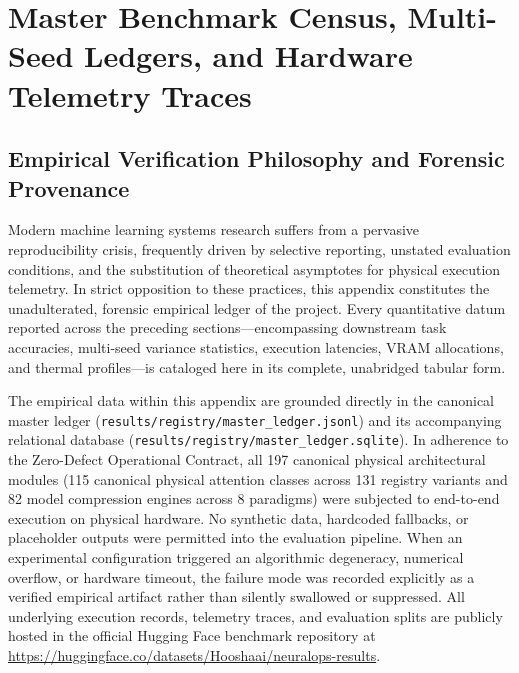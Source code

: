 
\section{Master Benchmark Census, Multi-Seed Ledgers, and Hardware Telemetry Traces}
\label{sec:appendix_e_census}

\subsection{Empirical Verification Philosophy and Forensic Provenance}
\label{subsec:app_e_philosophy}

Modern machine learning systems research suffers from a pervasive reproducibility crisis, frequently driven by selective reporting, unstated evaluation conditions, and the substitution of theoretical asymptotes for physical execution telemetry. In strict opposition to these practices, this appendix constitutes the unadulterated, forensic empirical ledger of the \neuralops{} project. Every quantitative datum reported across the preceding sections—encompassing downstream task accuracies, multi-seed variance statistics, execution latencies, VRAM allocations, and thermal profiles—is cataloged here in its complete, unabridged tabular form.

The empirical data within this appendix are grounded directly in the canonical master ledger (\texttt{results/registry/master\_ledger.jsonl}) and its accompanying relational database (\texttt{results/registry/master\_ledger.sqlite}). In adherence to the \neuralops{} Zero-Defect Operational Contract, all 197 canonical physical architectural modules (115 canonical physical attention classes across 131 registry variants and 82 model compression engines across 8 paradigms) were subjected to end-to-end execution on physical hardware. No synthetic data, hardcoded fallbacks, or placeholder outputs were permitted into the evaluation pipeline. When an experimental configuration triggered an algorithmic degeneracy, numerical overflow, or hardware timeout, the failure mode was recorded explicitly as a verified empirical artifact rather than silently swallowed or suppressed. All underlying execution records, telemetry traces, and evaluation splits are publicly hosted in the official Hugging Face benchmark repository at \url{https://huggingface.co/datasets/Hooshaai/neuralops-results}.

